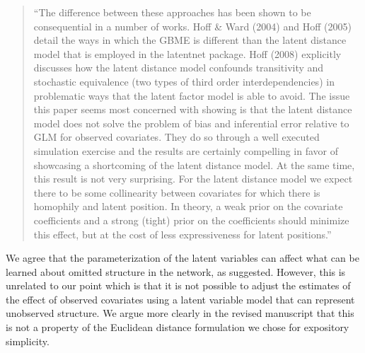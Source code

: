 \begin{quote}
``The difference between these approaches has been shown to be
consequential in a number of works. Hoff \& Ward (2004) and Hoff (2005)
detail the ways in which the GBME is different than the latent distance
model that is employed in the latentnet package. Hoff (2008) explicitly
discusses how the latent distance model confounds transitivity and
stochastic equivalence (two types of third order interdependencies) in
problematic ways that the latent factor model is able to avoid. The
issue this paper seems most concerned with showing is that the latent
distance model does not solve the problem of bias and inferential error
relative to GLM for observed covariates. They do so through a well
executed simulation exercise and the results are certainly compelling in
favor of showcasing a shortcoming of the latent distance model. At the
same time, this result is not very surprising. For the latent distance
model we expect there to be some collinearity between covariates for
which there is homophily and latent position. In theory, a weak prior on
the covariate coefficients and a strong (tight) prior on the
coefficients should minimize this effect, but at the cost of less
expressiveness for latent positions.''
\end{quote}

We agree that the parameterization of the latent variables can affect
what can be learned about omitted structure in the network, as
suggested. However, this is unrelated to our point which is that it is
not possible to adjust the estimates of the effect of observed
covariates using a latent variable model that can represent unobserved
structure. We argue more clearly in the revised manuscript that this is
not a property of the Euclidean distance formulation we chose for
expository simplicity.
